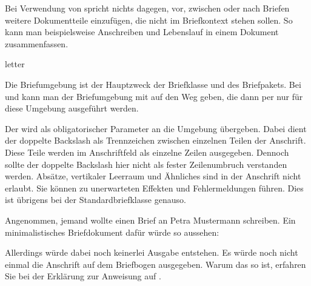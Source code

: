 Bei Verwendung von  spricht nichts dagegen, vor,
zwischen oder nach Briefen weitere Dokumentteile einzufügen, die nicht im
Briefkontext stehen sollen. So kann man beispielsweise Anschreiben und
Lebenslauf in einem Dokument zusammenfassen.

\begin{Declaration}
  \begin{Environment}{letter}
  \end{Environment}
\end{Declaration}
%
\iffalse%
Die Briefumgebung \Environment{letter} ist einer der zentralen Dreh- und
Angelpunkte der Briefklasse und des Briefpakets. Als
Besonderheit\textnote{\KOMAScript{} vs. Standardklassen} kann man bei
\Class{scrlttr2} und \Package{scrletter} der Briefumgebung zusätzliche
\PName{Optionen} mit auf den Weg geben.  Diese werden dann intern per
\DescRef{\LabelBase.cmd.KOMAoptions}-Anweisung ausgeführt.%
\else%
Die Briefumgebung  ist der Hauptzweck der Briefklasse und
des Briefpakets. Bei
 und  kann man der Briefumgebung
 mit auf den Weg geben, die dann per
 nur für diese Umgebung ausgeführt
werden.%
\fi%

Der  wird als obligatorischer Parameter an die Umgebung
übergeben. Dabei dient der doppelte Backslash als
Trennzeichen zwischen einzelnen Teilen der Anschrift. Diese Teile
werden im Anschriftfeld als einzelne Zeilen ausgegeben. Dennoch sollte der
doppelte Backslash hier nicht als fester Zeilenumbruch verstanden
werden. Absätze, vertikaler Leerraum und Ähnliches sind in der Anschrift nicht
erlaubt. Sie können zu unerwarteten Effekten und Fehlermeldungen führen. Dies
ist übrigens bei der Standardbriefklasse genauso.

\begin{Example}
  \label{desc:\LabelBase.env.letter.example}%
  Angenommen, jemand wollte einen Brief an Petra Mustermann schreiben.
  Ein minimalistisches Briefdokument dafür würde so aussehen:
  Allerdings würde dabei noch keinerlei Ausgabe
  entstehen. Es würde noch nicht einmal die Anschrift auf dem Briefbogen
  ausgegeben. Warum das so ist, erfahren Sie bei der Erklärung zur Anweisung
   auf .
\end{Example}

